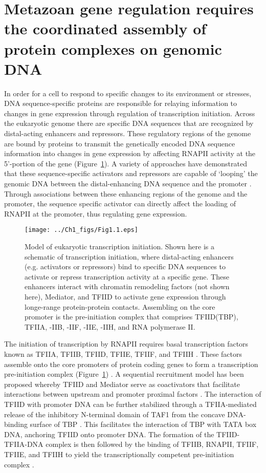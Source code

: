 \section{Metazoan gene regulation requires the coordinated assembly of protein complexes on genomic DNA}

In order for a cell to respond to specific changes to its environment or stresses, DNA sequence-specific proteins are responsible for relaying information to changes in gene expression through regulation of transcription initiation. Across the eukaryotic genome there are specific DNA sequences that are recognized by distal-acting enhancers and repressors. These regulatory regions of the genome are bound by proteins to transmit the genetically encoded DNA sequence information into changes in gene expression by affecting RNAPII activity at the 5’-portion of the gene (Figure~\ref{fig:Fig1.1}). A variety of approaches have demonstrated that these sequence-specific activators and repressors are capable of ‘looping’ the genomic DNA between the distal-enhancing DNA sequence and the promoter \cite{d_41}. Through associations between these enhancing regions of the genome and the promoter, the sequence specific activator can directly affect the loading of RNAPII at the promoter, thus regulating gene expression.\\ 
\begin{figure}
\centering
\texttt{[image: ../Ch1\_figs/Fig1.1.eps]}
\caption[Model of eukaryotic transcription initiation]{Model of eukaryotic transcription initiation.  Shown here is a schematic of transcription initiation, where distal-acting enhancers (e.g. activators or repressors) bind to specific DNA sequences to activate or repress transcription activity at a specific gene.  These enhancers interact with chromatin remodeling factors (not shown here), Mediator, and TFIID to activate gene expression through longe-range protein-protein contacts.  Assembling on the core promoter is the pre-initiation complex that comprises TFIID(TBP), TFIIA, -IIB, -IIF, -IIE, -IIH, and RNA polymerase II.}
\label{fig:Fig1.1}
\end{figure}
\indent The initiation of transcription by RNAPII requires basal transcription factors known as TFIIA, TFIIB, TFIID, TFIIE, TFIIF, and TFIIH \cite{Thomas_1201}. These factors assemble onto the core promoters of protein coding genes to form a transcription pre-initiation complex (Figure~\ref{fig:Fig1.1}) \cite{Buratowski_3748,Rhee_24}. A sequential recruitment model has been proposed whereby TFIID and Mediator serve as coactivators that facilitate interactions between upstream and promoter proximal factors \cite{Burley_3049}. The interaction of TFIID with promoter DNA can be further stabilized through a TFIIA-mediated release of the inhibitory N-terminal domain of TAF1 from the concave DNA-binding surface of TBP \cite{Bagby_2202,Geiger_2949,Liu_2574}. This facilitates the interaction of TBP with TATA box DNA, anchoring TFIID onto promoter DNA. The formation of the TFIID-TFIIA-DNA complex is then followed by the binding of TFIIB, RNAPII, TFIIF, TFIIE, and TFIIH to yield the transcriptionally competent pre-initiation complex \cite{Thomas_1201}.\\ 
